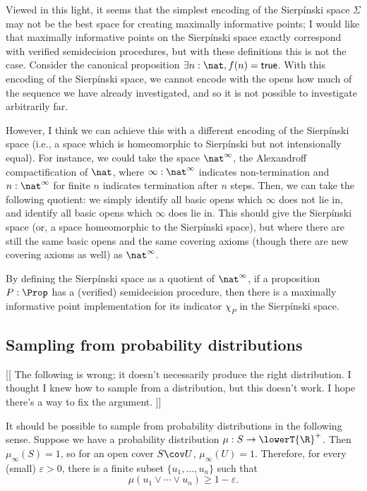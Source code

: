 Viewed in this light, it seems that the simplest encoding of the Sierpínski space $\Sigma$ may not be the best space for creating maximally informative points; I would like that maximally informative points on the Sierpínski space exactly correspond with verified semidecision procedures, but with these definitions this is not the case. Consider the canonical proposition $\exists n : \nat, f(n) = \mathsf{true}$. With this encoding of the Sierpínski space, we cannot encode with the opens how much of the sequence we have already investigated, and so it is not possible to investigate arbitrarily far.

However, I think we can achieve this with a different encoding of the Sierpínski space (i.e., a space which is homeomorphic to Sierpínski but not intensionally equal). For instance, we could take the space $\nat^\infty$, the Alexandroff compactification of $\nat$, where $\infty : \nat^\infty$ indicates non-termination and $n : \nat^\infty$ for finite $n$ indicates termination after $n$ steps. Then, we can take the following quotient: we simply identify all basic opens which $\infty$ does not lie in, and identify all basic opens which $\infty$ does lie in. This should give the Sierpínski space (or, a space homeomorphic to the Sierpínski space), but where there are still the same basic opens and the same covering axioms (though there are new covering axioms as well) as $\nat^\infty$.

\begin{claim}
By defining the Sierpínski space as a quotient of $\nat^\infty$, if a proposition $P : \Prop$ has a (verified) semidecision procedure, then there is a maximally informative point implementation for its indicator $\chi_P$ in the Sierpínski space.
\end{claim}


\subsection{Sampling from probability distributions}

[[ The following is wrong; it doesn't necessarily produce the right distribution. I thought I knew how to sample from a distribution, but this doesn't work. I hope there's a way to fix the argument. ]]

It should be possible to sample from probability distributions in the following sense. Suppose we have a probability distribution $\mu : S \to \lowerT{\R}^+$. Then $\mu_\infty(S) = 1$, so for an open cover $S \cov U$, $\mu_\infty(U) = 1$. Therefore, for every (small) $\varepsilon > 0$, there is a finite subset $\{u_1, \ldots, u_n \}$ such that
\[
\mu(u_1 \vee \cdots \vee u_n) \ge 1 - \varepsilon.
\]

